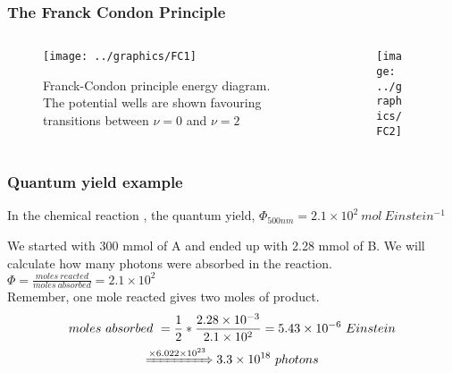\documentclass[ignorenonframetext]{beamer}
\begin{document}
\begin{frame}[shrink,label=FranckCondonL2]
\frametitle{The Franck Condon Principle}
\begin{columns}[onlytextwidth]
\begin{column}{.3\linewidth}
\begin{figure}[h!]
\texttt{[image: ../graphics/FC1]}
\caption{\footnotesize Franck-Condon principle energy diagram. The potential wells are shown favouring transitions between \(\nu = 0\) and \(\nu = 2\)}
\end{figure}
\end{column}
\begin{column}{.7\linewidth}
\begin{figure}[h!]
\texttt{[image: ../graphics/FC2]}
\end{figure}
\end{column}
\hyperlink{FranckCondonL4<5>}{}
\end{columns}
\end{frame}

\begin{frame}
\frametitle{Quantum yield example}
\begin{example}
In the chemical reaction , the quantum yield, \(\Phi_{500nm} = 2.1\times 10^2\ mol\ Einstein^{-1}\)\\\hspace{3pt}

We started with 300 mmol of A and ended up with 2.28 mmol of B. We will calculate how many photons were absorbed in the reaction.\\
\medskip \(\Phi = \frac{moles\ reacted}{moles\ absorbed} = 2.1\times 10^2\)\\
Remember, one mole reacted gives two moles of product.\\
\medskip \begin{multline*}moles\ absorbed\ = \frac{1}{2} *\frac{2.28\times 10^{-3}}{2.1\times 10^2} = 5.43\times 10^{-6}\ Einstein\\ \xRightarrow{\times 6.022\times10^{23}} 3.3\times 10^{18}\ photons\end{multline*}
\end{example}
\end{frame}
\end{document}
